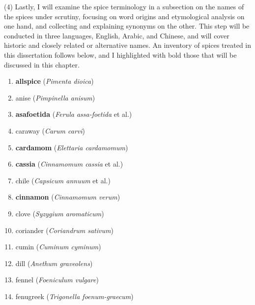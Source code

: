 (4) Lastly, I will examine the spice terminology in a subsection on the names of the spices under scrutiny, focusing on word origins and etymological analysis on one hand, and collecting and explaining synonyms on the other. This step will be conducted in three languages, English, Arabic, and Chinese, and will cover historic and closely related or alternative names. An inventory of spices treated in this dissertation follows below, and I highlighted with bold those that will be discussed in this chapter.

\bigskip

\begin{multicols}{2}
\begin{enumerate}
    \item \textbf{allspice} (\textit{Pimenta dioica}) \quad \hfill \pageref{sec:allspice}
    \item anise (\textit{Pimpinella anisum}) %
    \item \textbf{asafoetida} (\textit{Ferula assa-foetida} et al.) \quad \hfill \pageref{sec:asafoetida}
    \item caraway (\textit{Carum carvi}) %
    \item \textbf{cardamom} (\textit{Elettaria cardamomum}) \quad \hfill \pageref{sec:cardamom}
    \item \textbf{cassia} (\textit{Cinnamomum cassia} et al.) \quad \hfill \pageref{sec:cassia}
    \item chile (\textit{Capsicum annuum} et al.) %
    \item \textbf{cinnamon} (\textit{Cinnamomum verum}) \quad \hfill \pageref{sec:cinnamon}
    \item clove (\textit{Syzygium aromaticum}) %
    \item coriander (\textit{Coriandrum sativum}) %
    \item cumin (\textit{Cuminum cyminum}) %
    \item dill (\textit{Anethum graveolens}) %
    \item fennel (\textit{Foeniculum vulgare}) %
    \item fenugreek (\textit{\small Trigonella foenum-graecum}) %

\end{enumerate}
\end{multicols}

